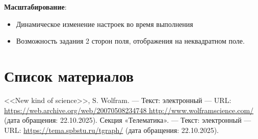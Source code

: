 \documentclass[11pt,a4paper,final]{article}
\begin{document}
		\par \textbf{Масштабирование}: 
		
		\begin{itemize}
			\item Динамическое изменение настроек во время выполнения
			\item Возможность задания 2 сторон поля, отображения на неквадратном поле.
		\end{itemize}
	
		\newpage
		\section* {Список материалов}
		\vspace{-1.1cm}
		\begin{thebibliography}{}
			 <<New kind of science>>, S. Wolfram. --- Текст: электронный  --- URL: \href{http://www.wolframscience.com/}{https://web.archive.org/web/20070508234748 http://www.wolframscience.com/} (дата обращения: 22.10.2025).
			 Секция «Телематика». --- Текст: электронный --- URL: \href{https://tema.spbstu.ru/tgraph/}{https://tema.spbstu.ru/tgraph/} (дата обращения: 22.10.2025).  
		\end{thebibliography}
		
		
	
\end{document}
